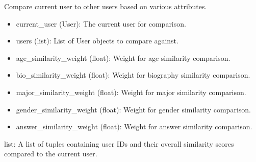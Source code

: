 \documentclass[letterpaper,10pt,english]{sphinxmanual}
\begin{document}

\begin{fulllineitems}
\label{\detokenize{routes.feed:routes.feed.routes.compare_users_to_current}}
\pysigstartsignatures
{}
\pysigstopsignatures
\sphinxAtStartPar
Compare current user to other users based on various attributes.
\begin{description}
\begin{itemize}
\item {} 
\sphinxAtStartPar
current\_user (User): The current user for comparison.

\item {} 
\sphinxAtStartPar
users (list): List of User objects to compare against.

\item {} 
\sphinxAtStartPar
age\_similarity\_weight (float): Weight for age similarity comparison.

\item {} 
\sphinxAtStartPar
bio\_similarity\_weight (float): Weight for biography similarity comparison.

\item {} 
\sphinxAtStartPar
major\_similarity\_weight (float): Weight for major similarity comparison.

\item {} 
\sphinxAtStartPar
gender\_similarity\_weight (float): Weight for gender similarity comparison.

\item {} 
\sphinxAtStartPar
answer\_similarity\_weight (float): Weight for answer similarity comparison.

\end{itemize}

\sphinxAtStartPar
list: A list of tuples containing user IDs and their overall similarity scores compared to the current user.

\end{description}

\end{fulllineitems}

\end{document}
